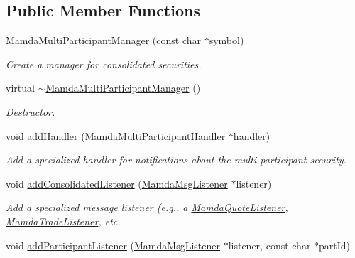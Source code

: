 \subsection*{Public Member Functions}
\begin{CompactItemize}
\item 
\hyperlink{classWombat_1_1MamdaMultiParticipantManager_799180862cc602700bde5e4cda9bddb4}{Mamda\-Multi\-Participant\-Manager} (const char $\ast$symbol)
\begin{CompactList}\small\item\em Create a manager for consolidated securities. \item\end{CompactList}\item 
virtual \hyperlink{classWombat_1_1MamdaMultiParticipantManager_8fe05673332e0d57f0a77cc45fe32866}{$\sim$Mamda\-Multi\-Participant\-Manager} ()
\begin{CompactList}\small\item\em Destructor. \item\end{CompactList}\item 
void \hyperlink{classWombat_1_1MamdaMultiParticipantManager_15c57fa29aab488747d1febedba15111}{add\-Handler} (\hyperlink{classWombat_1_1MamdaMultiParticipantHandler}{Mamda\-Multi\-Participant\-Handler} $\ast$handler)
\begin{CompactList}\small\item\em Add a specialized handler for notifications about the multi-participant security. \item\end{CompactList}\item 
void \hyperlink{classWombat_1_1MamdaMultiParticipantManager_37997b38e78d2c76f470738087a0cb34}{add\-Consolidated\-Listener} (\hyperlink{classWombat_1_1MamdaMsgListener}{Mamda\-Msg\-Listener} $\ast$listener)
\begin{CompactList}\small\item\em Add a specialized message listener (e.g., a \hyperlink{classWombat_1_1MamdaQuoteListener}{Mamda\-Quote\-Listener}, \hyperlink{classWombat_1_1MamdaTradeListener}{Mamda\-Trade\-Listener}, etc. \item\end{CompactList}\item 
void \hyperlink{classWombat_1_1MamdaMultiParticipantManager_296f3ce08825ffaa6997a6c5fb67c496}{add\-Participant\-Listener} (\hyperlink{classWombat_1_1MamdaMsgListener}{Mamda\-Msg\-Listener} $\ast$listener, const char $\ast$part\-Id)

\end{CompactItemize}
